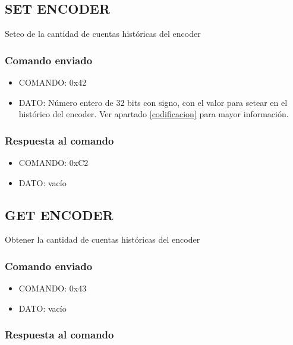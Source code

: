 \documentclass[a4paper,10pt]{article}
\begin{document}
\subsection{SET ENCODER}
\label{set_encoder}

Seteo de la cantidad de cuentas hist\'oricas del encoder

\subsubsection*{Comando enviado}

\begin{itemize}
	\item{COMANDO:} 0x42
	\item{DATO:} N\'umero entero de 32 bits con signo, con el valor para setear en el hist\'orico del encoder.
		Ver apartado \ref{codificacion} para mayor informaci\'on.
\end{itemize}

\subsubsection*{Respuesta al comando}

\begin{itemize}
	\item{COMANDO:} 0xC2
	\item{DATO:} vac\'io
\end{itemize}

\subsection{GET ENCODER}
\label{get_encoder}

Obtener la cantidad de cuentas hist\'oricas del encoder

\subsubsection*{Comando enviado}

\begin{itemize}
	\item{COMANDO:} 0x43
	\item{DATO:} vac\'io
\end{itemize}

\subsubsection*{Respuesta al comando}
\end{document}

